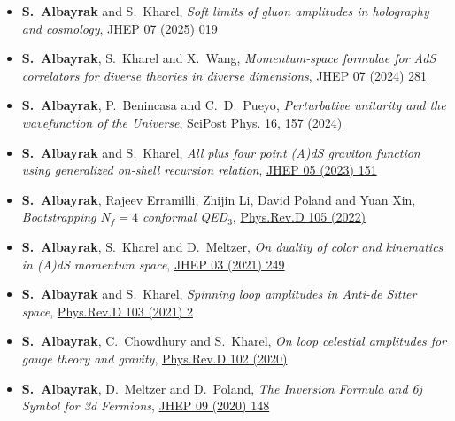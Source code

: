 \documentclass[a4paper,11pt]{article}
\begin{document}
 \begin{itemize}%
   	 \item[] {\bf S.~Albayrak} and {S.~Kharel}, \emph{Soft limits of gluon amplitudes in holography and cosmology}, \hyperref{https://inspirehep.net/literature/2850553}{}{}{JHEP 07 (2025) 019} 
 
  	 \item[] {\bf S.~Albayrak}, {S.~Kharel} and {X.~Wang}, \emph{Momentum-space formulae for AdS correlators for diverse theories in diverse dimensions}, \hyperref{https://inspirehep.net/literature/2729950}{}{}{JHEP 07 (2024) 281} 
 
  	 \item[] {\bf S.~Albayrak}, {P.~Benincasa} and {C.~D.~Pueyo}, \emph{Perturbative unitarity and the wavefunction of the Universe}, \hyperref{https://doi.org/10.21468/SciPostPhys.16.6.157}{}{}{SciPost Phys. 16, 157 (2024)} 
  	 
 	 \item[] {\bf S.~Albayrak} and  { S.~Kharel}, \emph{All plus four point (A)dS graviton function using generalized on-shell recursion relation}, \hyperref{https://inspirehep.net/literature/2634747}{}{}{JHEP 05 (2023) 151} 
 	
  	\item[] {\bf S.~Albayrak}, Rajeev Erramilli, Zhijin Li, David Poland  and Yuan Xin, \emph{Bootstrapping $N_f=4$ conformal QED$_3$}, \hyperref{https://inspirehep.net/literature/1984752}{}{}{Phys.Rev.D 105 (2022)}
 	
  	\item[] {\bf S.~Albayrak}, { S.~Kharel} and {D.~Meltzer}, \emph{On duality of color and kinematics in (A)dS momentum space}, \hyperref{https://inspirehep.net/literature/1837623}{}{}{JHEP 03 (2021) 249}
 
 \item[] {\bf S.~Albayrak} and  { S.~Kharel}, \emph{Spinning loop amplitudes in Anti-de Sitter space}, \hyperref{https://inspirehep.net/literature/1802534}{}{}{Phys.Rev.D 103 (2021) 2} 
 
 \item[] {\bf S.~Albayrak}, C.~Chowdhury and  { S.~Kharel}, \emph{On loop celestial amplitudes for gauge theory and gravity}, \hyperref{https://inspirehep.net/literature/1807927}{}{}{ Phys.Rev.D 102 (2020)}
 	
 
 \item[] {\bf S.~Albayrak}, D.~Meltzer and  { D.~Poland}, \emph{The Inversion Formula and 6j Symbol for 3d Fermions}, \hyperref{https://inspirehep.net/files/ff4743ee85b68ab8565052dbd4928f62}{}{}{JHEP 09 (2020) 148}
 

\end{itemize}
\end{document}
